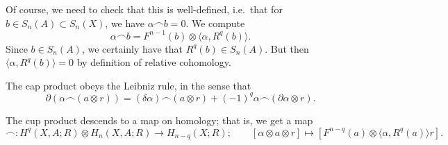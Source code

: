 \documentclass[main.tex]{subfiles}
\begin{document}
Of course, we need to check that this is well-defined, i.e.\ that for $b \in S_{n}(A) \subset S_{n}(X)$, we have $\alpha \frown b = 0$. We compute
\begin{equation*}
  \alpha \frown b = F^{n-1}(b) \otimes \langle \alpha, R^{q}(b) \rangle.
\end{equation*}
Since $b \in S_{n}(A)$, we certainly have that $R^{q}(b) \in S_{n}(A)$. But then $\langle\alpha, R^{q}(b)\rangle = 0$ by definition of relative cohomology.

\begin{lemma}
  \label{lemma:cap_product_leibniz_rule}
  The cap product obeys the Leibniz rule, in the sense that
  \begin{equation*}
    \partial(\alpha \frown (a \otimes r)) = (\delta \alpha) \frown (a \otimes r) + (-1)^{q} \alpha \frown (\partial \alpha \otimes r).
  \end{equation*}
\end{lemma}

\begin{proposition}
  The cup product descends to a map on homology; that is, we get a map
  \begin{equation*}
    \frown\colon H^{q}(X, A; R) \otimes H_{n}(X, A; R) \to H_{n-q}(X; R); \qquad [\alpha \otimes a \otimes r] \mapsto [F^{n-q}(a) \otimes \langle \alpha, R^{q}(a) \rangle r].
  \end{equation*}
\end{proposition}
\end{document}
